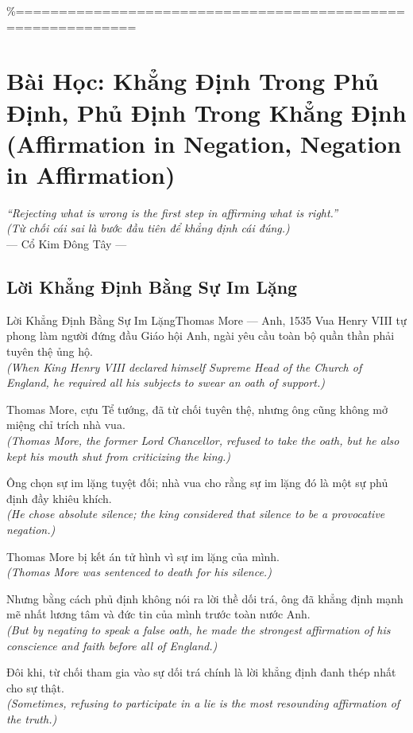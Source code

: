 \%============================================================
\chapter{Bài Học: Khẳng Định Trong Phủ Định, Phủ Định Trong Khẳng Định (Affirmation in Negation, Negation in Affirmation)}
\begin{center}
  \textit{\color{truyengold}``Rejecting what is wrong is the first step in affirming what is right.''}\\[4pt]
  \textit{(Từ chối cái sai là bước đầu tiên để khẳng định cái đúng.)}\\[4pt]
  \small\color{truyenblue}--- Cổ Kim Đông Tây ---
\end{center}
\ngancach

\section{Lời Khẳng Định Bằng Sự Im Lặng}
\begin{truyen}{Lời Khẳng Định Bằng Sự Im Lặng}{Thomas More --- Anh, 1535}
 Vua Henry VIII tự phong làm người đứng đầu Giáo hội Anh, ngài yêu cầu toàn bộ quần thần phải tuyên thệ ủng hộ.\\[4pt]
\textit{(When King Henry VIII declared himself Supreme Head of the Church of England, he required all his subjects to swear an oath of support.)}

Thomas More, cựu Tể tướng, đã từ chối tuyên thệ, nhưng ông cũng không mở miệng chỉ trích nhà vua.\\[4pt]
\textit{(Thomas More, the former Lord Chancellor, refused to take the oath, but he also kept his mouth shut from criticizing the king.)}

Ông chọn sự im lặng tuyệt đối; nhà vua cho rằng sự im lặng đó là một sự phủ định đầy khiêu khích.\\[4pt]
\textit{(He chose absolute silence; the king considered that silence to be a provocative negation.)}

Thomas More bị kết án tử hình vì sự im lặng của mình.\\[4pt]
\textit{(Thomas More was sentenced to death for his silence.)}

Nhưng bằng cách phủ định không nói ra lời thề dối trá, ông đã khẳng định mạnh mẽ nhất lương tâm và đức tin của mình trước toàn nước Anh.\\[4pt]
\textit{(But by negating to speak a false oath, he made the strongest affirmation of his conscience and faith before all of England.)}

\end{truyen}
\begin{baihoc}
  Đôi khi, từ chối tham gia vào sự dối trá chính là lời khẳng định đanh thép nhất cho sự thật.\\[4pt]
  \textit{(Sometimes, refusing to participate in a lie is the most resounding affirmation of the truth.)}
\end{baihoc}

